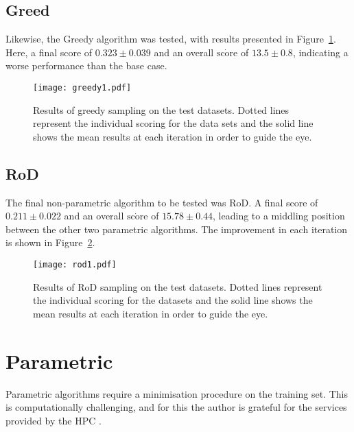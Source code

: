 \subsection{Greed}
Likewise, the Greedy algorithm was tested, with results presented in Figure~\ref{fig:GreedyTestSet}. Here, a final score of ${0.323\pm{}0.039}$ and an overall $\dot{\mathrm{score}}$ of $13.5\pm{}0.8$, indicating a worse performance than the base case.

\begin{figure}[H]
    \begin{center}
        \texttt{[image: greedy1.pdf]}
        \caption[Greedy]{Results of greedy sampling on the test datasets. Dotted lines represent the individual scoring for the data sets and the solid line shows the mean results at each iteration in order to guide the eye.}
        \label{fig:GreedyTestSet}
    \end{center}
\end{figure}

\subsection[Region of Disagreement]{RoD}
The final non-parametric algorithm to be tested was RoD. A final score of ${0.211\pm{}0.022}$ and an overall $\dot{\mathrm{score}}$ of $15.78\pm{}0.44$, leading to a middling position between the other two parametric algorithms. The improvement in each iteration is shown in Figure~\ref{fig:RODTestSet}.

\begin{figure}[H]
    \begin{center}
        \texttt{[image: rod1.pdf]}
        \caption[RoD]{Results of RoD sampling on the test datasets. Dotted lines represent the individual scoring for the datasets and the solid line shows the mean results at each iteration in order to guide the eye.}
        \label{fig:RODTestSet}
    \end{center}
\end{figure}

\section{Parametric}
Parametric algorithms require a minimisation procedure on the training set. This is computationally challenging, and for this the author is grateful for the services provided by the HPC \cite{HPC}.

